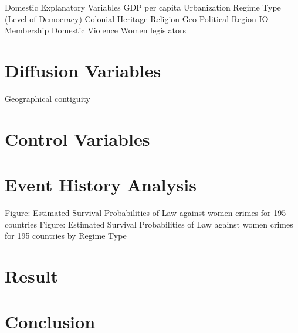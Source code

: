 \documentclass[]{article}
\begin{document}
Domestic Explanatory Variables GDP per capita Urbanization Regime Type
(Level of Democracy) Colonial Heritage Religion Geo-Political Region IO
Membership Domestic Violence Women legislators

\section{Diffusion Variables}\label{diffusion-variables}

Geographical contiguity

\section{Control Variables}\label{control-variables}

\section{Event History Analysis}\label{event-history-analysis}

Figure: Estimated Survival Probabilities of Law against women crimes for
195 countries Figure: Estimated Survival Probabilities of Law against
women crimes for 195 countries by Regime Type

\section{Result}\label{result}

\section{Conclusion}\label{conclusion}
\end{document}
